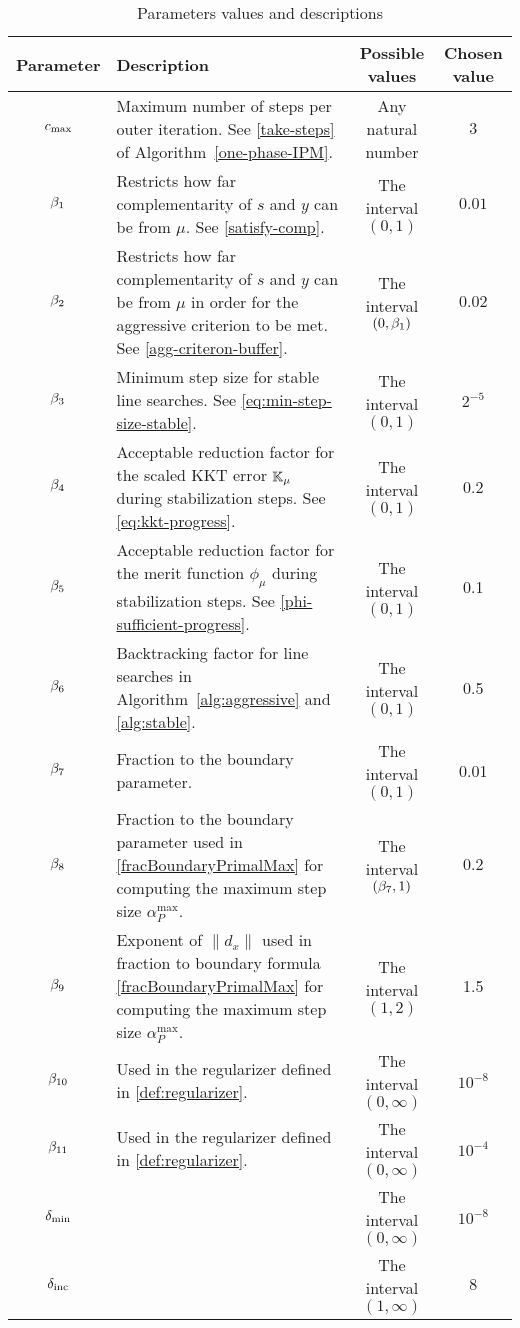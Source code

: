\documentclass{article}
\begin{document}
\begin{table}[H]
\begin{tabular}{ |c| p{7cm}|c|c| } 
 \hline
Parameter & Description & Possible values & Chosen value  \\ 
 \hline
$c_{\max}$ & Maximum number of steps per outer iteration. See \eqref{take-steps} of Algorithm~\ref{one-phase-IPM}.  & Any natural number & $3$  \\ 
 \hline
  $\beta_{1}$ & Restricts how far complementarity of $s$ and $y$ can be from $\mu$. See \eqref{satisfy-comp}.  & The interval $(0,1)$ & $0.01$ \\ 
 \hline
   $\beta_{2}$ & Restricts how far complementarity of $s$ and $y$ can be from $\mu$ in order for the aggressive criterion to be met. See \eqref{agg-criteron-buffer}.  & The interval  $(0, \beta_{1})$ & $0.02$  \\ 
    \hline
   $\beta_{3}$ & Minimum step size for stable line searches. See \eqref{eq:min-step-size-stable}.  & The interval $(0,1)$ & $2^{-5}$  \\ 
   \hline 
      $\beta_{4}$ & Acceptable reduction factor for the scaled KKT error $\mathbb{K}_{\mu}$ during stabilization steps. See \eqref{eq:kkt-progress}.  & The interval $(0,1)$ & 0.2 \\ 
      \hline
            $\beta_{5}$ & Acceptable reduction factor for the merit function $\phi_{\mu}$ during stabilization steps. See \eqref{phi-sufficient-progress}.  & The interval $(0,1)$ & 0.1  \\
    \hline
    $\beta_{6}$ & Backtracking factor for line searches in Algorithm~\ref{alg:aggressive} and \ref{alg:stable}. & The interval $(0,1)$ & 0.5 \\
\hline
 $\beta_{7}$ & Fraction to the boundary parameter.  & The interval $(0,1)$ & 0.01 \\ 
        \hline
$\beta_{8}$ & Fraction to the boundary parameter used in \eqref{fracBoundaryPrimalMax} for computing the maximum step size $\alpha_{P}^{\max}$. & The interval $(\beta_{7},1)$ & $0.2$ \\
\hline
$\beta_{9}$ & Exponent of $\| d_{x} \|$ used in fraction to boundary formula \eqref{fracBoundaryPrimalMax} for computing the maximum step size $\alpha_{P}^{\max}$. & The interval $(1,2)$ & 1.5 \\
\hline
$\beta_{10}$ & Used in the regularizer defined in \eqref{def:regularizer}. & The interval $(0,\infty)$ & $10^{-8}$ \\
\hline
$\beta_{11}$ & Used in the regularizer defined in \eqref{def:regularizer}. & The interval $(0,\infty)$ & $10^{-4}$ \\
\hline
$\delta_{\min}$ & & The interval $(0,\infty)$ & $10^{-8}$ \\
\hline
$\delta_{\text{inc}}$ & &The interval $(1,\infty)$ & $8$ \\
\hline
\end{tabular}
\caption{Parameters values and descriptions}
\end{table}
\end{document}

